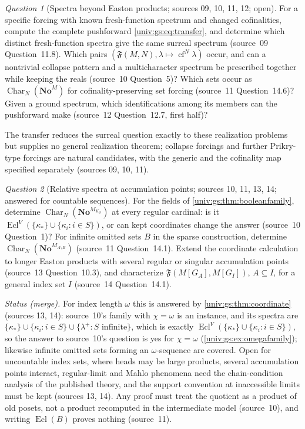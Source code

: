 \documentclass[11pt,letterpaper]{article}
\numberwithin{equation}{section}
\theoremstyle{definition}
\theoremstyle{remark}
\newtheorem{question}[question]{Question}
\newcommand{\No}{\mathbf{No}}
\newcommand{\NoM}{\No^{M}}
\newcommand{\cf}{\operatorname{cf}}
\newcommand{\Char}{\operatorname{Char}}
\newcommand{\FF}{\mathfrak F}
\newcommand{\Ecl}{\operatorname{Ecl}}
\begin{document}
\begin{question}[Spectra beyond Easton products; sources 09, 10, 11, 12; open]\label{univ:gs:q:beyondeaston}
For a specific forcing with known fresh-function spectrum and changed cofinalities, compute the
complete pushforward \eqref{univ:gs:eq:transfer}, and determine which distinct fresh-function
spectra give the same surreal spectrum (source~09 Question~11.8). Which pairs
$(\FF(M,N),\lambda\mapsto\cf^N\lambda)$ occur, and can a nontrivial collapse pattern and a
multicharacter spectrum be prescribed together while keeping the reals (source~10 Question~5)?
Which sets occur as $\Char_N(\NoM)$ for cofinality-preserving set forcing (source~11
Question~14.6)? Given a ground spectrum, which identifications among its members can the
pushforward make (source~12 Question~12.7, first half)?
\end{question}
The transfer reduces the surreal question exactly to these realization problems but supplies no
general realization theorem; collapse forcings and further Prikry-type forcings are natural
candidates, with the generic and the cofinality map specified separately (sources 09, 10, 11).

\begin{question}[Relative spectra at accumulation points; sources 10, 11, 13, 14; answered for countable sequences]\label{univ:gs:q:accumulation}
For the fields of \cref{univ:gs:thm:booleanfamily}, determine $\Char_N(\No^{M_{K_S}})$ at every
regular cardinal: is it $\Ecl^V(\{\kappa_*\}\cup\{\kappa_i:i\in S\})$, or can kept coordinates
change the answer (source~10 Question~1)? For infinite omitted sets $B$ in the sparse
construction, determine $\Char_N(\No^{M_{A\setminus B}})$ (source~11 Question~14.1). Extend the
coordinate calculation to longer Easton products with several regular or singular accumulation
points (source~13 Question~10.3), and characterize $\FF(M[G_A],M[G_I])$, $A\subseteq I$, for a
general index set $I$ (source~14 Question~14.1).
\end{question}
\emph{Status (merge).} For index length $\omega$ this is answered by \cref{univ:gs:thm:coordinate}
(sources 13, 14): source~10's family with $\chi=\omega$ is an instance, and its spectra are
$\{\kappa_*\}\cup\{\kappa_i:i\in S\}\cup\{\lambda^+:S\text{ infinite}\}$, which is exactly
$\Ecl^V(\{\kappa_*\}\cup\{\kappa_i:i\in S\})$, so the answer to source~10's question is yes for
$\chi=\omega$ (\cref{univ:gs:ex:omegafamily}); likewise infinite omitted sets forming an
$\omega$-sequence are covered. Open for uncountable index sets, where heads may be large
products, several accumulation points interact, regular-limit and Mahlo phenomena need the
chain-condition analysis of the published theory, and the support convention at inaccessible
limits must be kept (sources 13, 14). Any proof must treat the quotient as a product of old posets,
not a product recomputed in the intermediate model (source~10), and writing $\Ecl(B)$ proves
nothing (source~11).
\end{document}
